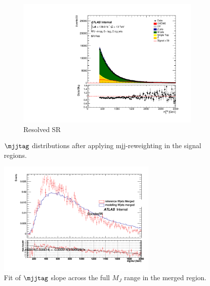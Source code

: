 \begin{figure}[ht]
\begin{subfigure}[b]{0.3\textwidth}
        \centering
        \includegraphics[width=\textwidth]{figures/mjjreweight1lep/SR_Res/stacked_plot_resolved_tagMjj.pdf}
        \caption{Resolved SR}
        \label{fig:MC16ADE_Resolved_SR}
    \end{subfigure}
    \caption{\(\mjjtag\) distributions after applying mjj-reweighting in the signal regions.}
    \label{fig:mjjReweight1LepMjjDistAfter}
\end{figure}


\begin{figure}[ht]
    \centering
    \includegraphics[width=0.7\textwidth]{figures/mjjreweight1lep/merged_WjetsAllMC16T.png}
    \caption{Fit of \(\mjjtag\) slope across the full \(M_J\) range in the merged region.}
    \label{fig:mjjReweight1LepMer}
\end{figure}

